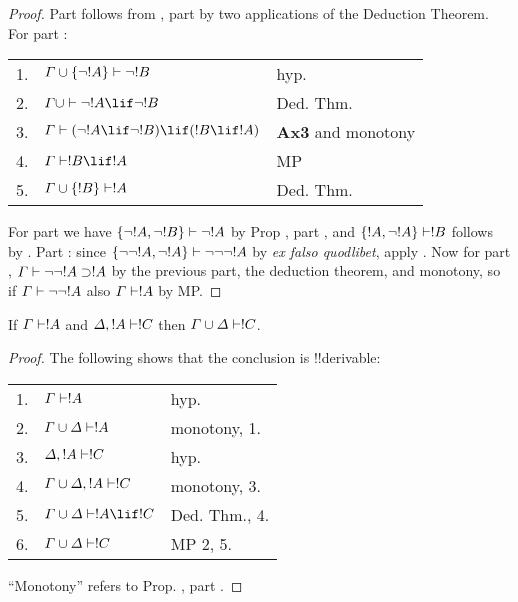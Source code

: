 \documentclass[../../include/open-logic-section]{subfiles}
\begin{document}
\begin{proof}
Part  follows from , part
 by two applications of the Deduction
Theorem. For part :

\begin{tabular}{rll}
  1. & $\Gamma \cup \{ \lnot !A\} \Proves \lnot !B$ & hyp. \\
  2. & $\Gamma \cup \Proves \lnot !A \lif \lnot !B$ & Ded. Thm.\\
  3. & $\Gamma \Proves (\lnot !A \lif \lnot !B) \lif (!B
  \lif !A)$ & \textbf{Ax3} and monotony \\
  4. & $\Gamma \Proves !B \lif !A$ & MP \\
  5. & $\Gamma \cup \{ !B\} \Proves !A$ & Ded. Thm.
\end{tabular}
  
For part  we have $\{\lnot !A,
\lnot !B \} \Proves \lnot !A$ by Prop , part
, and $\{ !A, \lnot!A\} \Proves
!B$ follows by . Part  : since
$\{\lnot\lnot !A, \lnot !A \} \Proves \lnot \lnot\lnot
!A$ by \emph{ex falso quodlibet}, apply  . Now
for part  , $\Gamma \Proves \lnot\lnot !A
\supset !A$ by the previous part, the deduction theorem, and
monotony, so if $\Gamma \Proves \lnot\lnot!A$ also $\Gamma \Proves
!A$ by MP. 
\end{proof}

\begin{thm}[Cut] 
If $\Gamma \Proves !A$ and $\Delta, !A \Proves
  !C$ then $\Gamma \cup \Delta \Proves !C$. 
\end{thm}

\begin{proof}
The following shows that the conclusion is !!{derivable}:

\begin{tabular}{rll}
1. & $\Gamma \Proves !A$ & hyp. \\
2. & $\Gamma\cup\Delta \Proves !A$ & monotony, 1.\\
3. & $\Delta, !A \Proves !C$ & hyp. \\
4. & $\Gamma \cup \Delta, !A \Proves !C$ & monotony, 3.\\
5. & $\Gamma \cup \Delta \Proves !A \lif !C$ & Ded. Thm., 4.\\
6. &  $\Gamma \cup \Delta \Proves !C$ & MP 2, 5.
\end{tabular}

\smallskip\noindent
``Monotony'' refers to Prop. , part
.
\end{proof}
\end{document}
